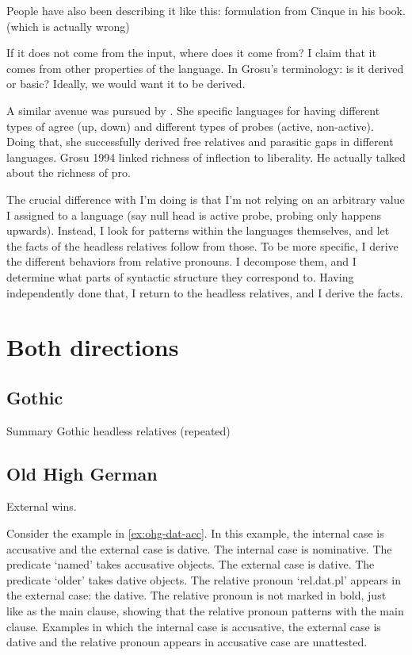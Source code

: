 People have also been describing it like this: formulation from Cinque in his book. (which is actually wrong)

If it does not come from the input, where does it come from? I claim that it comes from other properties of the language. In Grosu's terminology: is it derived or basic? Ideally, we would want it to be derived.

A similar avenue was pursued by \citealt{himmelreich2017}. She specific languages for having different types of agree (up, down) and different types of probes (active, non-active). Doing that, she successfully derived free relatives and parasitic gaps in different languages. Grosu 1994 linked richness of inflection to liberality. He actually talked about the richness of pro.


The crucial difference with I'm doing is that I'm not relying on an arbitrary value I assigned to a language (say null head is active probe, probing only happens upwards). Instead, I look for patterns within the languages themselves, and let the facts of the headless relatives follow from those. To be more specific, I derive the different behaviors from relative pronouns. I decompose them, and I determine what parts of syntactic structure they correspond to. Having independently done that, I return to the headless relatives, and I derive the facts.


\section{Both directions}

\subsection{Gothic}

\begin{table}[H]
  \center
  \caption{Summary Gothic headless relatives (repeated)}
    
    \label{tbl:summary-gothic-repeated}
\end{table}


\subsection{Old High German}

External wins.

Consider the example in \ref{ex:ohg-dat-acc}. In this example, the internal case is accusative and the external case is dative.
The internal case is nominative. The predicate  `named' takes accusative objects.
The external case is dative. The predicate  `older' takes dative objects.
The relative pronoun  `\ac{rel}.\ac{dat}.\ac{pl}' appears in the external case: the dative. The relative pronoun is not marked in bold, just like as the main clause, showing that the relative pronoun patterns with the main clause.
Examples in which the internal case is accusative, the external case is dative and the relative pronoun appears in accusative case are unattested.

